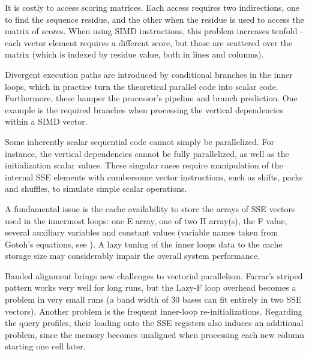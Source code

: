 
It is costly to access scoring matrices. Each access requires two indirections, one to find the sequence residue, and the other when the residue is used to access the matrix of scores. When using SIMD instructions, this problem increases tenfold - each vector element requires a different score, but those are scattered over the matrix (which is indexed by residue value, both in lines and columns).
	

Divergent execution paths are  introduced by conditional branches in the inner loops, which in practice turn the theoretical parallel code into scalar code. Furthermore, these hamper the processor's pipeline and branch prediction. One example is the required branches when processing the vertical dependencies within a SIMD vector.


Some inherently scalar sequential code cannot simply be parallelized. For instance, the vertical dependencies cannot be fully parallelized, as well as the initialization scalar values. These singular cases require manipulation of the internal SSE elements with cumbersome vector instructions, such as shifts, packs and shuffles, to simulate simple scalar operations.


A fundamental issue is the cache availability to store the arrays of SSE vectors used in the innermost loops: one E array, one of two H array(s), the F value, several auxiliary variables and constant values (variable names taken from Gotoh's equations, see ). A lazy tuning of the inner loops data to the cache storage size may considerably impair the overall system performance.


Banded alignment brings new challenges to vectorial parallelism. Farrar's striped pattern works very well for long runs, but the Lazy-F loop overhead becomes a problem in very small runs (a band width of 30 bases can fit entirely in two SSE vectors). Another problem is the frequent inner-loop re-initializations. 
Regarding the query profiles, their loading onto the SSE registers also induces an additional problem, since the memory becomes unaligned when processing each new column starting one cell later.
	
